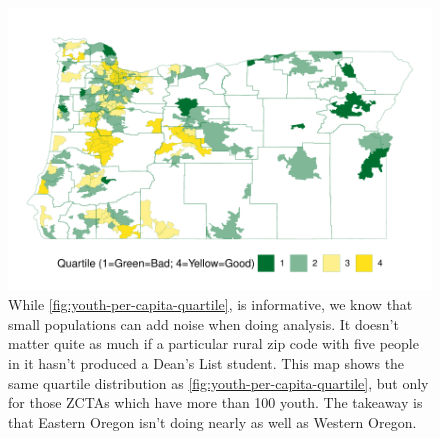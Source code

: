 \documentclass[10pt]{article}
\begin{document}
\begin{figure}[H]
	\centering
	\includegraphics[width=\linewidth]{../visualizations/youth-per-capita-quartile-100}
	\caption{
		While \ref{fig:youth-per-capita-quartile}, is informative, we know that small populations can add noise when doing analysis. It doesn't matter quite as much if a particular rural zip code with five people in it hasn't produced a Dean's List student. This map shows the same quartile distribution as \ref{fig:youth-per-capita-quartile}, but only for those ZCTAs which have more than 100 youth. The takeaway is that Eastern Oregon isn't doing nearly as well as Western Oregon.}
	\label{fig:youth-per-capita-quartile-100}
\end{figure}
\end{document}
